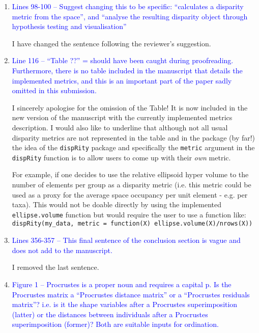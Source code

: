 \documentclass[12pt,letterpaper]{article}
\begin{document}
\begin{enumerate}
\item{\textcolor{blue}{Lines 98-100 – Suggest changing this to be specific: “calculates a disparity metric from the space”, and “analyse the resulting disparity object through hypothesis testing and visualisation”}}

I have changed the sentence following the reviewer's suggestion.

\item{\textcolor{blue}{Line 116 – “Table ??” = should have been caught during proofreading. Furthermore, there is no table included in the manuscript that details the implemented metrics, and this is an important part of the paper sadly omitted in this submission.}}
\label{table_missing}

I sincerely apologise for the omission of the Table! It is now included in the new version of the manuscript with the currently implemented metrics description.
I would also like to underline that although not all usual disparity metrics are not represented in the table and in the package (by far!) the idea of the \texttt{dispRity} package and specifically the \texttt{metric} argument in the \texttt{dispRity} function is to allow users to come up with their \textit{own} metric.

For example, if one decides to use the relative ellipsoid hyper volume to the number of elements per group as a disparity metric (i.e. this metric could be used as a proxy for the average space occupancy per unit element - e.g. per taxa).
This would not be doable directly by using the implemented \texttt{ellipse.volume} function but would require the user to use a function like:\\
\texttt{dispRity(my\_data, metric = function(X) ellipse.volume(X)/nrows(X))}\\


\item{\textcolor{blue}{Lines 356-357 – This final sentence of the conclusion section is vague and does not add to the manuscript.}}
\label{remove_last_sentence}

I removed the last sentence.

\item{\textcolor{blue}{Figure 1 – Procrustes is a proper noun and requires a capital p. Is the Procrustes matrix a “Procrustes distance matrix” or a “Procrustes residuals matrix”? i.e. is it the shape variables after a Procrustes superimposition (latter) or the distances between individuals after a Procrustes superimposition (former)? Both are suitable inputs for ordination.}}


\end{enumerate}
\end{document}
